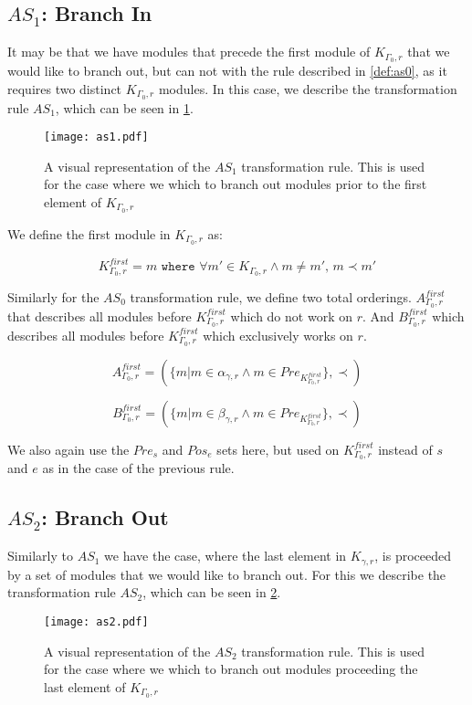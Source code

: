 \subsection{$AS_1$: Branch In}\label{sssec:bi}
It may be that we have modules that precede the first module of $K_{\Gamma_0 ,r}$ that we would like to branch out, but can not with the rule described in \cref{def:as0}, as it requires two distinct $K_{\Gamma_0 ,r}$ modules. In this case, we describe the transformation rule $AS_1$, which can be seen in \cref{fig:as1}.

\begin{figure}[H]
	\centering
	\texttt{[image: as1.pdf]}
	\caption{A visual representation of the $AS_1$ transformation rule. This is used for the case where we which to branch out modules prior to the first element of $K_{\Gamma_0 ,r}$}
	\label{fig:as1}
\end{figure}


 We define the first module in $K_{\Gamma_0 ,r}$ as:

\[K_{\Gamma_0 ,r}^{first} = m \texttt{ where } \forall m' \in K_{\Gamma_0 ,r} \land m \neq m',\, m \prec m' \] 

Similarly for the $AS_0$ transformation rule, we define two total orderings. $A_{\Gamma_0 ,r}^{first}$ that describes all modules before $K_{\Gamma_0 ,r}^{first}$ which do not work on $r$. And $B_{\Gamma_0 ,r}^{first}$ which describes all modules before $K_{\Gamma_0 ,r}^{first}$ which exclusively works on $r$.

\[ A_{\Gamma_0 ,r}^{first} = (\{m | m \in \alpha_{\gamma ,r}  \land m \in Pre_{K_{\Gamma_0 ,r}^{first}} \}, \prec) \]

\[ B_{\Gamma_0 ,r}^{first} = (\{m | m \in \beta_{\gamma ,r}  \land m \in Pre_{K_{\Gamma_0 ,r}^{first}} \}, \prec) \]

We also again use the $Pre_s$ and $Pos_e$ sets here, but used on $K_{\Gamma_0 ,r}^{first}$ instead of $s$ and $e$ as in the case of the previous rule.
  

\subsection{$AS_2$: Branch Out}
Similarly to $AS_1$ we have the case, where the last element in $K_{\gamma ,r}$, is proceeded by a set of modules that we would like to branch out. For this we describe the transformation rule $AS_2$, which can be seen in \cref{fig:as2}.

\begin{figure}[H]
	\centering
	\texttt{[image: as2.pdf]}
	\caption{A visual representation of the $AS_2$ transformation rule. This is used for the case where we which to branch out modules proceeding the last element of $K_{\Gamma_0 ,r}$}
	\label{fig:as2}
\end{figure}


